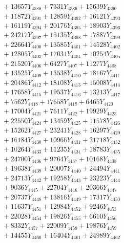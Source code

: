 \documentclass[a4paper,10pt]{article}
\begin{document}
{\begin{align}
&\;  + 13657 Y_{4388} + 7331 Y_{4389} + 15639 Y_{4390} \\[0.3ex]
&\;  + 11872 Y_{4391} + 12859 Y_{4392} + 16121 Y_{4393} \\[0.3ex]
&\;  + 16119 Y_{4394} + 20176 Y_{4395} + 18903 Y_{4396} \\[0.3ex]
&\;  + 24217 Y_{4397} + 15135 Y_{4398} + 17887 Y_{4399} \\[0.3ex]
&\;  + 22664 Y_{4400} + 13585 Y_{4401} + 14528 Y_{4402} \\[0.3ex]
&\;  + 12805 Y_{4403} + 17031 Y_{4404} + 10254 Y_{4405} \\[0.3ex]
&\;  + 21520 Y_{4406} + 6427 Y_{4407} + 11277 Y_{4408} \\[0.5ex]\allowbreak
&\;  + 13525 Y_{4409} + 13538 Y_{4410} + 18167 Y_{4411} \\[0.3ex]
&\;  + 20486 Y_{4412} + 18108 Y_{4413} + 15008 Y_{4414} \\[0.3ex]
&\;  + 17658 Y_{4415} + 19537 Y_{4416} + 13213 Y_{4417} \\[0.3ex]
&\;  + 7562 Y_{4418} + 17658 Y_{4419} + 6465 Y_{4420} \\[0.3ex]
&\;  + 17004 Y_{4421} + 7611 Y_{4422} + 19929 Y_{4423} \\[0.3ex]
&\;  + 22550 Y_{4424} + 13459 Y_{4425} + 11578 Y_{4426} \\[0.3ex]
&\;  + 15262 Y_{4427} + 23241 Y_{4428} + 16297 Y_{4429} \\[0.3ex]
&\;  + 16184 Y_{4430} + 10966 Y_{4431} + 21718 Y_{4432} \\[0.3ex]
&\;  + 10264 Y_{4433} + 11235 Y_{4434} + 18783 Y_{4435} \\[0.3ex]
&\;  + 24700 Y_{4436} + 9764 Y_{4437} + 10168 Y_{4438} \\[0.5ex]\allowbreak
&\;  + 19638 Y_{4439} + 20007 Y_{4440} + 24494 Y_{4441} \\[0.3ex]
&\;  + 24713 Y_{4442} + 19258 Y_{4443} + 23223 Y_{4444} \\[0.3ex]
&\;  + 9036 Y_{4445} + 22704 Y_{4446} + 20366 Y_{4447} \\[0.3ex]
&\;  + 20737 Y_{4448} + 13816 Y_{4449} + 17317 Y_{4450} \\[0.3ex]
&\;  + 11637 Y_{4451} + 12984 Y_{4452} + 9246 Y_{4453} \\[0.3ex]
&\;  + 22028 Y_{4454} + 19826 Y_{4455} + 6610 Y_{4456} \\[0.3ex]
&\;  + 8332 Y_{4457} + 22009 Y_{4458} + 19876 Y_{4459} \\[0.3ex]
&\;  + 14455 Y_{4460} + 16404 Y_{4461} + 24989 Y_{4462} \\[0.3ex]

\end{align}}
\end{document}
